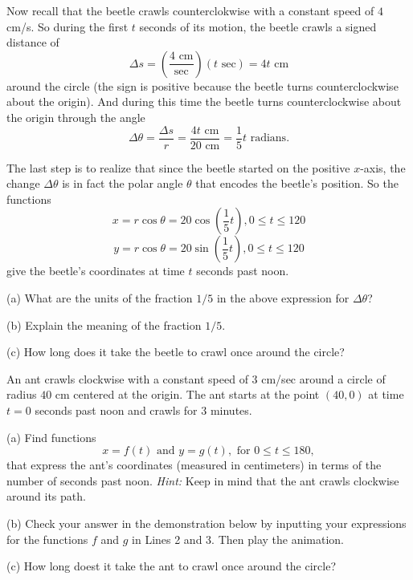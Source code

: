 \documentclass{ximera}
\begin{document}
Now recall that the beetle crawls counterclokwise with a constant speed of $4$ cm/s.  So during the first $t$ seconds of its motion, the beetle crawls a signed distance of
\[
   \Delta  s = \left( \frac{4 \text{ cm}}{\text{sec}} \right) (t \text{ sec}) = 4t \text{ cm}  
\]
around the circle (the sign is positive because the beetle turns counterclockwise about the origin). And during this time the beetle turns counterclockwise about the origin through the angle
\[
    \Delta \theta = \frac{\Delta s}{r} = \frac{4t \text{ cm}}{20 \text{ cm}} = \frac{1}{5}t \text{ radians}.
\]

The last step is to realize that since the beetle started on the positive $x$-axis, the change $\Delta \theta$  is in fact the polar angle $\theta$ that encodes the beetle's position. So the functions
\[
    x = r\cos \theta = 20 \cos \left( \frac{1}{5}t \right) , 0\leq t \leq 120
\]
\[
    y = r\cos \theta = 20 \sin \left( \frac{1}{5}t \right) , 0\leq t \leq 120
\]
give the beetle's coordinates at time $t$ seconds past noon.


\begin{question}  \label{Qgf45365:Motion1}
(a) What are the units of the fraction $1/5$ in the above expression for $\Delta \theta$?

(b) Explain the meaning of the fraction $1/5$.

(c) How long does it take the beetle to crawl once around the circle?
\end{question}


\begin{question}  \label{Q345tds5:Motion1}
An ant crawls clockwise with a constant speed of $3$ cm/sec around a circle of radius $40$ cm centered at the origin. The ant starts at the point $(40,0)$ at time $t=0$ seconds past noon and crawls for $3$ minutes.

(a) Find functions
\[
   x = f(t) \text{ and } y=g(t) , \text{ for } 0\leq t \leq 180 ,
\]
that express the ant's coordinates (measured in centimeters) in terms of the number of seconds past noon. {\it Hint:} Keep in mind that the ant crawls clockwise around its path.

(b) Check your answer in the demonstration below by inputting your expressions for the functions $f$ and $g$ in Lines 2 and 3. Then play the animation.

(c) How long doest it take the ant to crawl once around the circle?

 
\begin{onlineOnly}
    \begin{center}
\end{center}
\end{onlineOnly}

\end{question}
\end{document}
